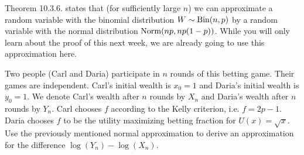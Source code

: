 \documentclass[assignments]{subfiles}
\begin{document}
Theorem 10.3.6. states that (for sufficiently large $n$) we can approximate a random variable with the binomial distribution $W  \sim \mathrm{Bin}(n, p)$ by a random variable with the normal distribution $\mathrm{Norm}(np, np(1-p))$. While you will only learn about the proof of this next week, we are already going to use this approximation here.

\begin{exercise}
Two people (Carl and Daria) participate in $n$ rounds of this betting game. Their games are independent. Carl's initial wealth is $x_0 = 1$ and Daria's initial wealth is $y_0 = 1$. We denote Carl's wealth after $n$ rounds by $X_n$ and Daria's wealth after $n$ rounds by $Y_n$. Carl chooses $f$ according to the Kelly criterion, i.e. $f = 2p-1$.  Daria chooses $f$ to be the  utility maximizing betting fraction for  $U(x) = \sqrt{x}$.
Use the previously mentioned normal approximation to derive an approximation for the difference $\log(Y_n) - \log(X_n)$.

\end{exercise}
\end{document}

